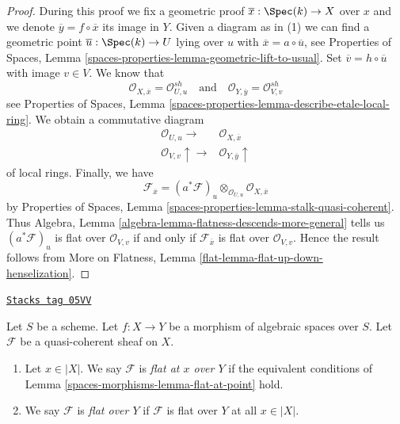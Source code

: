 \begin{proof}
During this proof we fix a geometric proof
$\overline{x} : \Spec(k) \to X$ over $x$ and
we denote $\overline{y} = f \circ \overline{x}$ its image in $Y$.
Given a diagram as in (1) we can find a geometric point
$\overline{u} : \Spec(k) \to U$ lying over $u$ with
$\overline{x} = a \circ \overline{u}$, see
Properties of Spaces, Lemma
\ref{spaces-properties-lemma-geometric-lift-to-usual}.
Set $\overline{v} = h \circ \overline{u}$ with image $v \in V$.
We know that
$$
\mathcal{O}_{X, \overline{x}} = \mathcal{O}_{U, u}^{sh}
\quad\text{and}\quad
\mathcal{O}_{Y, \overline{y}} = \mathcal{O}_{V, v}^{sh}
$$
see
Properties of Spaces, Lemma
\ref{spaces-properties-lemma-describe-etale-local-ring}.
We obtain a commutative diagram
$$
\begin{array}{cc}\mathcal{O}_{U, u} \longrightarrow & \mathcal{O}_{X, \overline{x}} \\ \mathcal{O}_{V, v} \uparrow\longrightarrow & \mathcal{O}_{Y, \overline{y}} \uparrow\end{array}
$$
of local rings. Finally, we have
$$
\mathcal{F}_{\overline{x}} =
(a^*\mathcal{F})_u \otimes_{\mathcal{O}_{U, u}}
\mathcal{O}_{X, \overline{x}}
$$
by
Properties of Spaces, Lemma \ref{spaces-properties-lemma-stalk-quasi-coherent}.
Thus
Algebra, Lemma \ref{algebra-lemma-flatness-descends-more-general}
tells us $(a^*\mathcal{F})_u$ is flat over $\mathcal{O}_{V, v}$
if and only if $\mathcal{F}_{\overline{x}}$ is flat over $\mathcal{O}_{V, v}$.
Hence the result follows from
More on Flatness, Lemma \ref{flat-lemma-flat-up-down-henselization}.
\end{proof}

\begin{definition}
\label{spaces-morphisms-definition-flat-module}
\href{https://stacks.math.columbia.edu/tag/05VV}{\texttt{Stacks tag 05VV}}

Let $S$ be a scheme.
Let $f : X \to Y$ be a morphism of algebraic spaces over $S$.
Let $\mathcal{F}$ be a quasi-coherent sheaf on $X$.
\begin{enumerate}
\item Let $x \in |X|$. We say $\mathcal{F}$ is {\it flat at $x$ over $Y$}
if the equivalent conditions of
Lemma \ref{spaces-morphisms-lemma-flat-at-point}
hold.
\item We say $\mathcal{F}$ is {\it flat over $Y$} if $\mathcal{F}$ is
flat over $Y$ at all $x \in |X|$.
\end{enumerate}
\end{definition}

